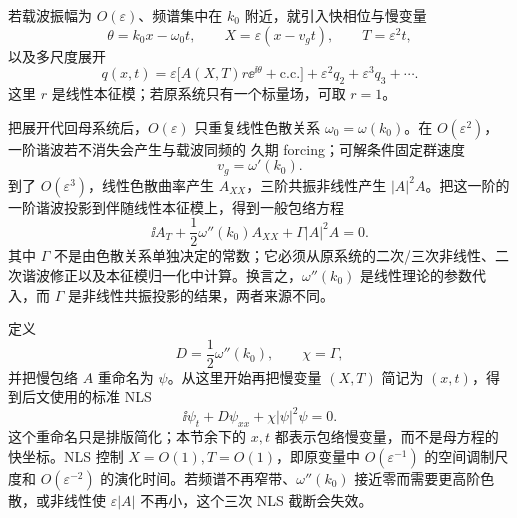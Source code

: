 若载波振幅为 $O(\varepsilon)$、频谱集中在 $k_0$ 附近，就引入快相位与慢变量
\[
\theta=k_0x-\omega_0t,
\qquad
X=\varepsilon(x-v_gt),
\qquad
T=\varepsilon^2t,
\]
以及多尺度展开
\[
q(x,t)=\varepsilon\bigl[A(X,T)r\ee^{\ii\theta}+\text{c.c.}\bigr]
+\varepsilon^2q_2+\varepsilon^3q_3+\cdots.
\]
这里 $r$ 是线性本征模；若原系统只有一个标量场，可取 $r=1$。

把展开代回母系统后，$O(\varepsilon)$ 只重复线性色散关系 $\omega_0=\omega(k_0)$。在 $O(\varepsilon^2)$，一阶谐波若不消失会产生与载波同频的 久期 forcing；可解条件固定群速度
\[
\boxed{v_g=\omega'(k_0)}.
\]
到了 $O(\varepsilon^3)$，线性色散曲率产生 $A_{XX}$，三阶共振非线性产生 $|A|^2A$。把这一阶的一阶谐波投影到伴随线性本征模上，得到一般包络方程
\begin{equation*}\boxed{
\ii A_T+\frac12\omega''(k_0)A_{XX}+\Gamma|A|^2A=0
}.\end{equation*}
其中 $\Gamma$ 不是由色散关系单独决定的常数；它必须从原系统的二次/三次非线性、二次谐波修正以及本征模归一化中计算。换言之，$\omega''(k_0)$ 是线性理论的参数代入，而 $\Gamma$ 是非线性共振投影的结果，两者来源不同。

定义
\begin{equation*}D=\frac12\omega''(k_0),
\qquad
\chi=\Gamma,\end{equation*}
并把慢包络 $A$ 重命名为 $\psi$。从这里开始再把慢变量 $(X,T)$ 简记为 $(x,t)$，得到后文使用的标准 NLS
\begin{equation}
\boxed{
\ii\psi_t+D\psi_{xx}+\chi|\psi|^2\psi=0
}.
\label{eq:nls-general}
\end{equation}
这个重命名只是排版简化；本节余下的 $x,t$ 都表示包络慢变量，而不是母方程的快坐标。NLS 控制 $X=O(1),T=O(1)$，即原变量中 $O(\varepsilon^{-1})$ 的空间调制尺度和 $O(\varepsilon^{-2})$ 的演化时间。若频谱不再窄带、$\omega''(k_0)$ 接近零而需要更高阶色散，或非线性使 $\varepsilon|A|$ 不再小，这个三次 NLS 截断会失效。

